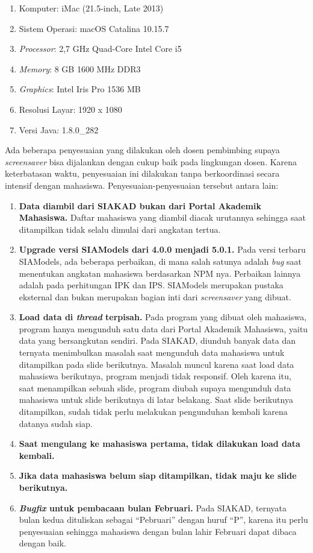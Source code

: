 \begin{enumerate}
	\item Komputer: iMac (21.5-inch, Late 2013)
    \item Sistem Operasi: macOS Catalina 10.15.7
    \item \textit{Processor}: 2,7 GHz Quad-Core Intel Core i5
    \item \textit{Memory}: 8 GB 1600 MHz DDR3
    \item \textit{Graphics}: Intel Iris Pro 1536 MB
    \item Resolusi Layar: 1920 x 1080
    \item Versi Java: 1.8.0\_282
\end{enumerate}

Ada beberapa penyesuaian yang dilakukan oleh dosen pembimbing supaya \textit{screensaver} bisa dijalankan dengan cukup baik pada lingkungan dosen. Karena keterbatasan waktu, penyesuaian ini dilakukan tanpa berkoordinasi secara intensif dengan mahasiswa. Penyesuaian-penyesuaian tersebut antara lain:

\begin{enumerate}
	\item \textbf{Data diambil dari SIAKAD bukan dari Portal Akademik Mahasiswa.} Daftar mahasiswa yang diambil diacak urutannya sehingga saat ditampilkan tidak selalu dimulai dari angkatan tertua.
    \item \textbf{Upgrade versi SIAModels dari 4.0.0 menjadi 5.0.1.} Pada versi terbaru SIAModels, ada beberapa perbaikan, di mana salah satunya adalah \textit{bug} saat menentukan angkatan mahasiswa berdasarkan NPM nya. Perbaikan lainnya adalah pada perhitungan IPK dan IPS. SIAModels merupakan pustaka eksternal dan bukan merupakan bagian inti dari \textit{screensaver} yang dibuat.
    \item \textbf{Load data di \textit{thread} terpisah.} Pada program yang dibuat oleh mahasiswa, program hanya mengunduh satu data dari Portal Akademik Mahasiswa, yaitu data yang bersangkutan sendiri. Pada SIAKAD, diunduh banyak data dan ternyata menimbulkan masalah saat mengunduh data mahasiswa untuk ditampilkan pada slide berikutnya. Masalah muncul karena saat load data mahasiswa berikutnya, program menjadi tidak responsif. Oleh karena itu, saat menampilkan sebuah slide, program diubah supaya mengunduh data mahasiswa untuk slide berikutnya di latar belakang. Saat slide berikutnya ditampilkan, sudah tidak perlu melakukan pengunduhan kembali karena datanya sudah siap.
    \item \textbf{Saat mengulang ke mahasiswa pertama, tidak dilakukan load data kembali.}
    \item \textbf{Jika data mahasiswa belum siap ditampilkan, tidak maju ke slide berikutnya.}
    \item \textbf{\textit{Bugfix} untuk pembacaan bulan Februari.} Pada SIAKAD, ternyata bulan kedua dituliskan sebagai ``Pebruari'' dengan huruf ``P'', karena itu perlu penyesuaian sehingga mahasiswa dengan bulan lahir Februari dapat dibaca dengan baik.
\end{enumerate}

